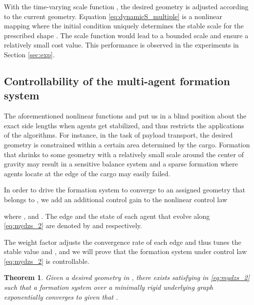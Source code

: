 \documentclass[times]{rncauth}
\newtheorem{thm}{Theorem}[section]
\begin{document}
With the time-varying scale function , the desired
geometry  is adjusted according to the current
geometry. Equation \eqref{eq:dynamicS_multiple} is a
nonlinear mapping  where the
 initial condition   uniquely determines the stable scale
 for the prescribed shape . The scale function
 would lead to a bounded scale and ensure a relatively
small cost value. This performance is observed in the experiments in
Section \ref{sec:exp}.

\subsection{Controllability of the multi-agent formation
system}\label{sec:multiple} The aforementioned nonlinear functions
 and  put us in a blind position about the
exact side lengths when agents get stabilized, and thus restricts
the applications of the algorithms. For instance, in the task of
payload transport, the desired geometry is constrained within a
certain area determined by the  cargo. Formation that shrinks to
some geometry with a relatively small scale  around the center of
gravity may result in a sensitive balance system and a sparse
formation where agents locate at the edge of the cargo may easily
failed.

In order to drive the formation system to converge to an assigned
geometry that belongs to , we add an additional
control gain  to the nonlinear control law

where ,  and . The edge
and the state of each agent that evolve along \eqref{eq:mydzs_2} are
denoted by  and  respectively.

The weight factor  adjusts the convergence rate of each edge
and thus tunes the stable value  and
, and we will prove that  the
formation system under control law \eqref{eq:mydzs_2} is
controllable.
\begin{thm}
  Given a desired geometry  in , there exists  satisfying
  in \eqref{eq:mydzs_2} such that a formation
  system over a minimally rigid underlying graph exponentially converges to  given that
  .
  \end{thm}
\end{document}
